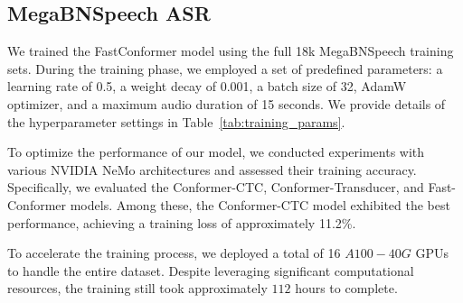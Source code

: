 \subsection{MegaBNSpeech ASR}

We trained the FastConformer model \cite{rekesh2023fast} using the full 18k MegaBNSpeech training sets. During the training phase, we employed a set of predefined parameters: a learning rate of 0.5, a weight decay of 0.001, a batch size of 32, AdamW optimizer, and a maximum audio duration of 15 seconds. We provide details of the hyperparameter settings in Table~\ref{tab:training_params}.


To optimize the performance of our model, we conducted experiments with various NVIDIA NeMo architectures and assessed their training accuracy. Specifically, we evaluated the Conformer-CTC, Conformer-Transducer, and Fast-Conformer models. Among these, the Conformer-CTC model exhibited the best performance, achieving a training loss of approximately 11.2\%.

To accelerate the training process, we deployed a total of 16 $A100-40G$ GPUs to handle the entire dataset. Despite leveraging significant computational resources, the training still took approximately $112$ hours to complete.




